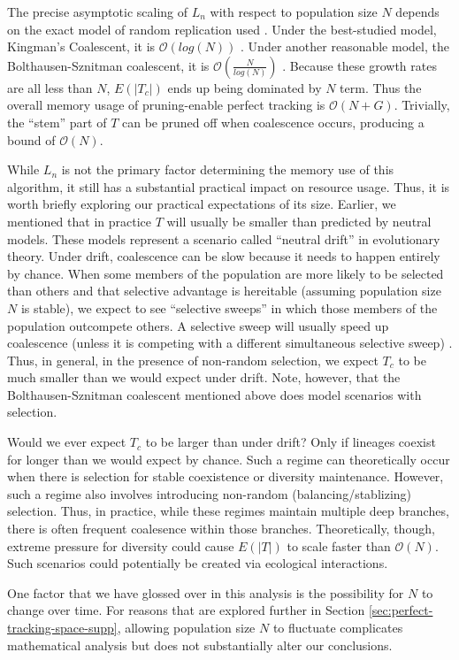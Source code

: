 The precise asymptotic scaling of $L_n$ with respect to population size $N$ depends on the exact model of random replication used \citep{tellierCoalescenceMultipleBranching2014}.
Under the best-studied model, Kingman's Coalescent, it is $\mathcal{O}(log(N))$ \citep{kingmanCoalescent1982, delmasAsymptoticResultsLength2008}.
Under another reasonable model, the Bolthausen-Sznitman coalescent, it is $\mathcal{O}(\frac{N}{log(N)})$ \citep{drmotaAsymptoticResultsConcerning2007}.
Because these growth rates are all less than $N$, $E(|T_c|)$ ends up being dominated by $N$ term. 
Thus the overall memory usage of pruning-enable perfect tracking is $\mathcal{O}(N + G)$.
Trivially, the ``stem'' part of $T$ can be pruned off when coalescence occurs, producing a bound of $\mathcal{O}(N)$.

While $L_n$ is not the primary factor determining the memory use of this algorithm, it still has a substantial practical impact on resource usage.
Thus, it is worth briefly exploring our practical expectations of its size.
Earlier, we mentioned that in practice $T$ will usually be smaller than predicted by neutral models.
These models represent a scenario called ``neutral drift'' in evolutionary theory. 
Under drift, coalescence can be slow because it needs to happen entirely by chance.
When some members of the population are more likely to be selected than others and that selective advantage is hereitable (assuming population size $N$ is stable), we expect to see ``selective sweeps'' in which those members of the population outcompete others.
A selective sweep will usually speed up coalescence (unless it is competing with a different simultaneous selective sweep) \citep{neherGeneticDraftSelective2013}.
Thus, in general, in the presence of non-random selection, we expect $T_c$ to be much smaller than we would expect under drift.
Note, however, that the Bolthausen-Sznitman coalescent mentioned above does model scenarios with selection.

Would we ever expect $T_c$ to be larger than under drift?
Only if lineages coexist for longer than we would expect by chance.
Such a regime can theoretically occur when there is selection for stable coexistence or diversity maintenance.
However, such a regime also involves introducing non-random (balancing/stablizing) selection.
Thus, in practice, while these regimes maintain multiple deep branches, there is often frequent coalesence within those branches.
Theoretically, though, extreme pressure for diversity could cause $E(|T|)$ to scale faster than $\mathcal{O}(N)$.
Such scenarios could potentially be created via ecological interactions.

One factor that we have glossed over in this analysis is the possibility for $N$ to change over time.
For reasons that are explored further in Section \ref{sec:perfect-tracking-space-supp}, allowing population size $N$ to fluctuate complicates mathematical analysis but does not substantially alter our conclusions.

